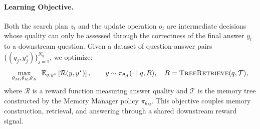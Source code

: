 \paragraph{Learning Objective.}
Both the search plan $z_t$ and the update operation $o_t$ are intermediate decisions whose quality can only be assessed through the correctness of the final answer $y_t$ to a downstream question. Given a dataset of question-answer pairs $\{(q_j, y_j^\star)\}_{j=1}^{N_q}$, we optimize:
\begin{equation}\label{eq:objective}
\max_{\theta_M, \theta_R, \theta_A} \;\; \mathbb{E}_{q,y^\star} \left[ \mathcal{R}(y, y^\star) \right], \qquad y \sim \pi_{\theta_A}(\cdot \mid q, R), \quad R = \textsc{TreeRetrieve}(q, \mathcal{T}),
\end{equation}
where $\mathcal{R}$ is a reward function measuring answer quality and $\mathcal{T}$ is the memory tree constructed by the Memory Manager policy $\pi_{\theta_M}$. This objective couples memory construction, retrieval, and answering through a shared downstream reward signal.
